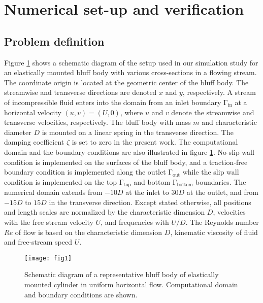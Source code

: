 \documentclass{jfm}
\begin{document}
\section{Numerical set-up and verification}\label{sec:convergence}

\subsection{Problem definition}\label{sec:prob}
Figure \ref{fig:schematic} shows a schematic diagram of the setup used in our simulation study 
for an elastically mounted bluff body with various cross-sections in a flowing stream. 
The coordinate origin is located at the geometric center of the bluff body.
The streamwise and transverse directions are denoted $x$ and $y$, respectively.
%
A stream of incompressible fluid enters into the domain from an 
inlet boundary $\mathrm{\Gamma_{in}}$ at a horizontal velocity $(u,v)=(U,0)$, where $u$ and $v$ 
denote the streamwise and transverse velocities, respectively. 
The bluff body with mass $m$ and characteristic diameter $D$ is mounted on a linear spring 
in the transverse direction. The damping coefficient $\zeta$ is set to zero in the present work.
%
The computational domain and the boundary conditions are also illustrated 
in figure \ref{fig:schematic}. 
No-slip wall condition is implemented on the surfaces of the bluff body, and a traction-free
boundary condition is implemented along the outlet $\mathrm{\Gamma_{out}}$
while the slip wall condition is implemented on the top $\mathrm{\Gamma_{top}}$
and bottom $\mathrm{\Gamma_{bottom}}$ boundaries.
%
The numerical domain extends from $-10D$ at the inlet to $30D$ at the outlet, 
and from $-15D$ to $15D$ in the transverse direction.
%
Except stated otherwise, all positions and length scales are normalized by 
the characteristic dimension $D$, velocities
with the free stream velocity $U$, and frequencies with $U/D$.
%
The Reynolds number $Re$ of flow is based on the
characteristic dimension $D$, kinematic viscosity of fluid 
and free-stream speed $U$.

\begin{figure}
	 \centering
	 \texttt{[image: fig1]}
     \caption{Schematic diagram of a representative bluff body of 
     elastically mounted cylinder in uniform horizontal flow. 
     Computational domain and boundary conditions are shown.}
\label{fig:schematic}
\end{figure}
\end{document}
